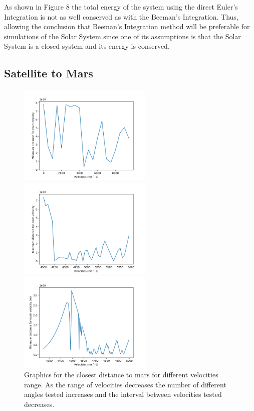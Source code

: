 \documentclass{article}
\begin{document}
{As shown in Figure 8 the total energy of the system using the direct Euler's Integration is not as well conserved as with the Beeman's Integration. Thus,  allowing the conclusion that Beeman's Integration method will be preferable for simulations of the Solar System since one of its assumptions is that the Solar System is a closed system and its energy is conserved. }

\subsection{Satellite to Mars}

\begin{figure}[H]
    \centering

    \includegraphics[width=6.40cm, height=4.80cm]{Long Range Velocities Survey - 9 degrees.png}


    \includegraphics[width=6.40cm, height=4.80cm]{Full velocities medium survey.png}

    \includegraphics[width=6.40cm, height=4.80cm]{Velocity Big Survey.png}
    \caption{Graphics for the closest distance to mars for different velocities range. As the range of velocities decreases the number of different angles tested increases and the interval between velocities tested decreases.}
    \label{fig:my_label}

\end{figure}
\end{document}
